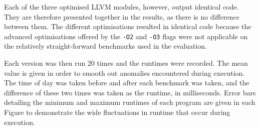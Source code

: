 Each of the three optimised LLVM modules, however, output identical code. They are therefore presented together in the results, as there is no difference between them. The different optimisations resulted in identical code because the advanced optimisations offered by the \verb|-O2| and \verb|-O3| flags were not applicable on the relatively straight-forward benchmarks used in the evaluation.

Each version was then run 20 times and the runtimes were recorded. The mean value is given in order to smooth out anomalies encountered during execution. The time of day was taken before and after each benchmark was taken, and the difference of these two times was taken as the runtime, in milliseconds. Error bars detailing the minimum and maximum runtimes of each program are given in each Figure to demonstrate the wide fluctuations in runtime that occur during execution.
